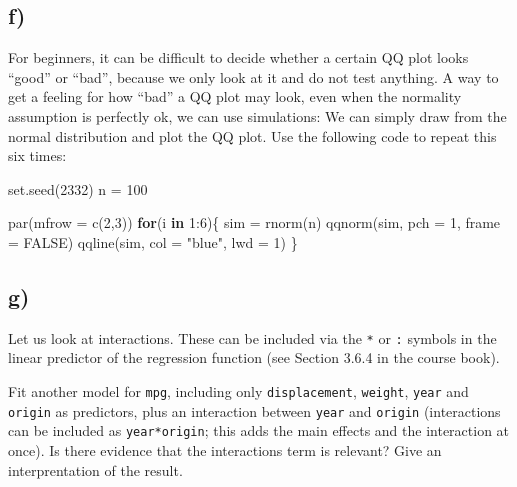 \documentclass[
]{article}
\newenvironment{Shaded}{\begin{snugshade}}{\end{snugshade}}
\newcommand{\AttributeTok}[1]{\textcolor[rgb]{0.77,0.63,0.00}{#1}}
\newcommand{\ConstantTok}[1]{\textcolor[rgb]{0.00,0.00,0.00}{#1}}
\newcommand{\ControlFlowTok}[1]{\textcolor[rgb]{0.13,0.29,0.53}{\textbf{#1}}}
\newcommand{\DecValTok}[1]{\textcolor[rgb]{0.00,0.00,0.81}{#1}}
\newcommand{\FunctionTok}[1]{\textcolor[rgb]{0.00,0.00,0.00}{#1}}
\newcommand{\NormalTok}[1]{#1}
\newcommand{\OtherTok}[1]{\textcolor[rgb]{0.56,0.35,0.01}{#1}}
\newcommand{\SpecialCharTok}[1]{\textcolor[rgb]{0.00,0.00,0.00}{#1}}
\newcommand{\StringTok}[1]{\textcolor[rgb]{0.31,0.60,0.02}{#1}}
\begin{document}
\hypertarget{f}{%
\subsection{f)}\label{f}}

For beginners, it can be difficult to decide whether a certain QQ plot
looks ``good'' or ``bad'', because we only look at it and do not test
anything. A way to get a feeling for how ``bad'' a QQ plot may look,
even when the normality assumption is perfectly ok, we can use
simulations: We can simply draw from the normal distribution and plot
the QQ plot. Use the following code to repeat this six times:

\begin{Shaded}
\begin{Highlighting}[]
\FunctionTok{set.seed}\NormalTok{(}\DecValTok{2332}\NormalTok{)}
\NormalTok{n }\OtherTok{=} \DecValTok{100}

\FunctionTok{par}\NormalTok{(}\AttributeTok{mfrow =} \FunctionTok{c}\NormalTok{(}\DecValTok{2}\NormalTok{,}\DecValTok{3}\NormalTok{))}
\ControlFlowTok{for}\NormalTok{(i }\ControlFlowTok{in} \DecValTok{1}\SpecialCharTok{:}\DecValTok{6}\NormalTok{)\{}
\NormalTok{  sim }\OtherTok{=} \FunctionTok{rnorm}\NormalTok{(n)}
  \FunctionTok{qqnorm}\NormalTok{(sim, }\AttributeTok{pch =} \DecValTok{1}\NormalTok{, }\AttributeTok{frame =} \ConstantTok{FALSE}\NormalTok{)}
  \FunctionTok{qqline}\NormalTok{(sim, }\AttributeTok{col =} \StringTok{"blue"}\NormalTok{, }\AttributeTok{lwd =} \DecValTok{1}\NormalTok{)}
\NormalTok{\}}
\end{Highlighting}
\end{Shaded}

\hypertarget{g}{%
\subsection{g)}\label{g}}

Let us look at interactions. These can be included via the \texttt{*} or
\texttt{:} symbols in the linear predictor of the regression function
(see Section 3.6.4 in the course book).

Fit another model for \texttt{mpg}, including only
\texttt{displacement}, \texttt{weight}, \texttt{year} and
\texttt{origin} as predictors, plus an interaction between \texttt{year}
and \texttt{origin} (interactions can be included as
\texttt{year*origin}; this adds the main effects and the interaction at
once). Is there evidence that the interactions term is relevant? Give an
interprentation of the result.
\end{document}

